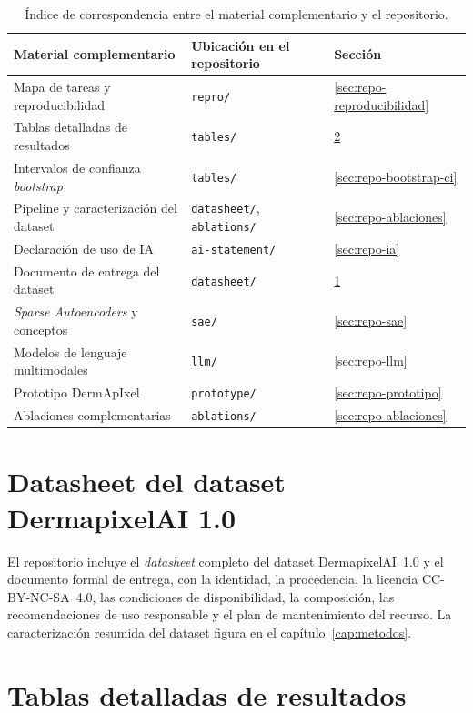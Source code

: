 \begin{table}[H]
\centering
\footnotesize
\setlength{\tabcolsep}{5pt}
\renewcommand{\arraystretch}{1.1}
\caption{Índice de correspondencia entre el material complementario y el repositorio.}
\label{tab:repo-indice}
\begin{tabular}{lll}
\hline
Material complementario & Ubicación en el repositorio & Sección \\
\hline
Mapa de tareas y reproducibilidad & \texttt{repro/} & \ref{sec:repo-reproducibilidad} \\
Tablas detalladas de resultados & \texttt{tables/} & \ref{sec:repo-tablas} \\
Intervalos de confianza \emph{bootstrap} & \texttt{tables/} & \ref{sec:repo-bootstrap-ci} \\
Pipeline y caracterización del dataset & \texttt{datasheet/}, \texttt{ablations/} & \ref{sec:repo-ablaciones} \\
Declaración de uso de IA & \texttt{ai-statement/} & \ref{sec:repo-ia} \\
Documento de entrega del dataset & \texttt{datasheet/} & \ref{sec:repo-datasheet} \\
\emph{Sparse Autoencoders} y conceptos & \texttt{sae/} & \ref{sec:repo-sae} \\
Modelos de lenguaje multimodales & \texttt{llm/} & \ref{sec:repo-llm} \\
Prototipo DermApIxel & \texttt{prototype/} & \ref{sec:repo-prototipo} \\
Ablaciones complementarias & \texttt{ablations/} & \ref{sec:repo-ablaciones} \\
\hline
\end{tabular}
\end{table}

\section{Datasheet del dataset DermapixelAI 1.0}
\label{sec:repo-datasheet}

El repositorio incluye el \emph{datasheet} completo del dataset
DermapixelAI~1.0 y el documento formal de entrega, con la
identidad, la procedencia, la licencia CC-BY-NC-SA~4.0, las
condiciones de disponibilidad, la composición, las
recomendaciones de uso responsable y el plan de mantenimiento del
recurso. La caracterización resumida del dataset figura en el
capítulo~\ref{cap:metodos}.

\section{Tablas detalladas de resultados}
\label{sec:repo-tablas}

